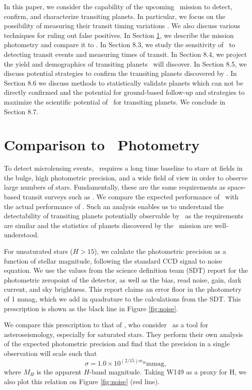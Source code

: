In this paper, we consider the capability of the upcoming \WF\ mission
to detect, confirm, and characterize transiting planets. In
particular, we focus on the possibility of measuring their transit timing variations \citep[TTVs,][]{Agol05, Holman05,LithwickWu12}. We
also discuss various techniques for ruling out false positives. In
Section \ref{sec:kepler}, we describe the mission photometry and compare it to \kep. 
In Section 8.3, we study
the sensitivity of \WF\ to detecting transit events and measuring
times of transit. 
In Section 8.4, we project the yield and demographics of transiting planets \WF\ will 
discover. In Section 8.5, we discuss potential strategies to
confirm the transiting planets discovered by \WF.  In Section 8.6 we discuss 
methods to statistically validate planets which can not be directly confirmed and
the potential for ground-based follow-up and strategies to maximize the
scientific potential of \WF\ for transiting planets. 
We conclude in Section 8.7.

\section{Comparison to \kep\ Photometry}
\label{sec:kepler}

To detect microlensing events, \WF\ requires a long time baseline to stare at fields
in the bulge, high photometric precision, and a wide field of view in order to observe
large numbers of stars.
Fundamentally, these are the same requirements as space-based transit surveys such as \kep.
We compare the expected performance of \WF\ with the actual
performance of \kep.
Such an analysis enables us to understand the detectability of transiting planets
potentially
observable by \WF\ 
as the requirements are similar and the statistics of planets discovered by the \kep\ 
mission are well-understood.


For unsaturated stars ($H > 15$), we calulate the photometric precision as a function of stellar magnitude, following
the standard CCD signal to noise equation. We use the values from the science definition team (SDT) report \citep{Spergel15}
for the photometric zeropoint of the
detector, as well as the bias, read noise, gain, dark current, and sky brightness. 
This report claims an error floor in the photometry of 1 mmag, which we add in quadrature to
the calculations from the SDT. This prescription is shown as the black line in Figure \ref{fig:noise}.


We compare this prescription to that of \citet{Gould15}, who
consider \WF\ as a tool for asteroseismology, especially
for saturated stars.
They perform their own analysis of the expected photometric precision and find that the precision in a single observation will scale such that
\begin{equation}
\sigma = 1.0 \times 10^{(2/15)m_H} \textrm{mmag},
\end{equation}
where $M_H$ is the apparent $H$-band magnitude. 
Taking W149 as a proxy for H, we also plot this relation on Figure \ref{fig:noise} (red line).


